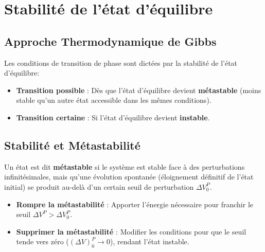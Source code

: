 \documentclass[french]{yLectureNote}
\begin{document}







\section{Stabilité de l'état d'équilibre}
\subsection{Approche Thermodynamique de Gibbs}

\begin{proposition}
Les conditions de transition de phase sont dictées par la stabilité de l'état d'équilibre:
\begin{itemize}
    \item \textbf{Transition possible} : Dès que l'état d'équilibre devient \textbf{métastable} (moins stable qu'un autre état accessible dans les mêmes conditions).
    \item \textbf{Transition certaine} : Si l'état d'équilibre devient \textbf{instable}.
\end{itemize}
\end{proposition}




\subsection{Stabilité et Métastabilité}

\begin{definition}
Un état est dit \textbf{métastable} si le système est stable face à des perturbations infinitésimales, mais qu'une évolution spontanée (éloignement définitif de l'état initial) se produit au-delà d'un certain seuil de perturbation $\Delta V_0^P$.
\end{definition}


\begin{itemize}
    \item \textbf{Rompre la métastabilité} : Apporter l'énergie nécessaire pour franchir le seuil $\Delta V^P > \Delta V_0^P$.
    \item \textbf{Supprimer la métastabilité} : Modifier les conditions pour que le seuil tende vers zéro ($(\Delta V)_0^P \to 0$), rendant l'état instable.
\end{itemize}
\end{document}
